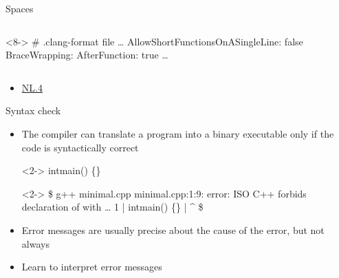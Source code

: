 \begin{frame}[fragile]{Spaces}
\begin{columns}[T]
  \begin{column}{.6\textwidth}
  \begin{codeblock}<8->{
# .clang-format file
\ldots
AllowShortFunctionsOnASingleLine: false
BraceWrapping:
  AfterFunction:   true
  \ldots}\end{codeblock}
  \end{column}
\end{columns}

\begin{itemize}[<9->]
\item \href{https://isocpp.github.io/CppCoreGuidelines/CppCoreGuidelines#nl4-maintain-a-consistent-indentation-style}{NL.4}
\end{itemize}

\end{frame}

\begin{frame}[fragile]{Syntax check}

  \begin{itemize}
  \item The compiler can translate a program into a binary executable only if the
    code is syntactically correct

  \begin{codeblock}<2->{
intmain() \{\}}\end{codeblock}

  \begin{shellblock}<2->{
\$ g++ minimal.cpp
minimal.cpp:1:9: error: ISO C++ forbids declaration of  with \ldots
    1 | intmain() \{\}
      |         ^
\$}\end{shellblock}

  \item<3-> Error messages are usually precise about the cause of the error, but
    not always
  \item<3-> Learn to interpret error messages
  \end{itemize}

\end{frame}

